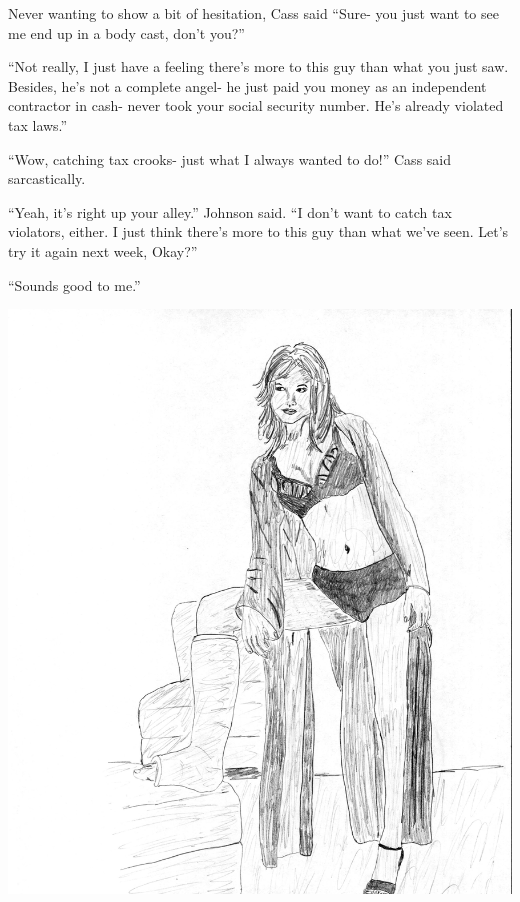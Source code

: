 Never wanting to show a bit of hesitation, Cass said ``Sure- you just want to see me end
up in a body cast, don't you?''

``Not really, I just have a feeling there's more to this guy than what you just saw.
Besides, he's not a complete angel- he just paid you money as an independent contractor in cash-
never took your social security number. He's already violated tax laws.''

``Wow, catching tax crooks- just what I always wanted to do!'' Cass said sarcastically.

``Yeah, it's right up your alley.'' Johnson said. ``I don't want to catch tax violators,
either. I just think there's more to this guy than what we've seen. Let's try it again next
week, Okay?''

``Sounds good to me.''

\newpage
\begin{center}
\includegraphics{images/kicks22.jpg}
\end{center}
